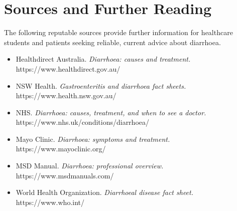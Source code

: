 \section*{Sources and Further Reading}
The following reputable sources provide further information for healthcare students and patients seeking reliable, current advice about diarrhoea.

\begin{itemize}
    \item Healthdirect Australia. \textit{Diarrhoea: causes and treatment.} https://www.healthdirect.gov.au/
    \item NSW Health. \textit{Gastroenteritis and diarrhoea fact sheets.} https://www.health.nsw.gov.au/
    \item NHS. \textit{Diarrhoea: causes, treatment, and when to see a doctor.} https://www.nhs.uk/conditions/diarrhoea/
    \item Mayo Clinic. \textit{Diarrhoea: symptoms and treatment.} https://www.mayoclinic.org/
    \item MSD Manual. \textit{Diarrhoea: professional overview.} https://www.msdmanuals.com/
    \item World Health Organization. \textit{Diarrhoeal disease fact sheet.} https://www.who.int/
\end{itemize}
